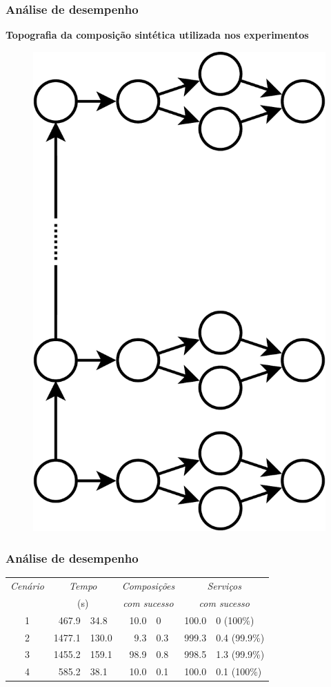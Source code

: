 \documentclass{beamer}
\newcommand\subtitulo[1]{{\large \textbf{#1}}}
\begin{document}
\begin{frame}
\frametitle{Análise de desempenho}

\subtitulo{Topografia da composição sintética utilizada nos experimentos}

\begin{figure}
\includegraphics[width=0.35\linewidth, angle=270]{img/eval_composition}
\end{figure}

\end{frame}



\begin{frame}
\frametitle{Análise de desempenho}

\begin{table}
\centering
\begin{tabular}{c r@{ $\pm$ }l r@{ $\pm$ }l r@{ $\pm$ }l} \hline

\emph{Cenário} & \multicolumn{2}{c}{\emph{Tempo}} & \multicolumn{2}{c}{\emph{Composições}}   & \multicolumn{2}{c}{\emph{Serviços}}\\
                 & \multicolumn{2}{c}{(s)}           & \multicolumn{2}{c}{\emph{com sucesso}} & \multicolumn{2}{c}{\emph{com sucesso}}\\
\hline
1 &  467.9 &  34.8 & 10.0 & 0   & 100.0 & 0   (100\%) \\
2 & 1477.1 & 130.0 &  9.3 & 0.3 & 999.3 & 0.4 (99.9\%)\\
3 & 1455.2 & 159.1 & 98.9 & 0.8 & 998.5 & 1.3 (99.9\%)\\
4 &  585.2 &  38.1 & 10.0 & 0.1 & 100.0 & 0.1 (100\%)\\
\hline \end{tabular}
\end{table}

\end{frame}
\end{document}
